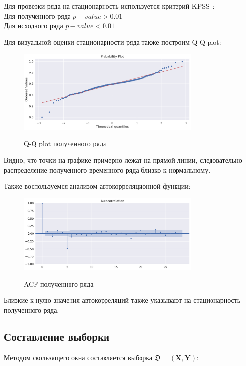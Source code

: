 Для проверки ряда на стационарность используется критерий KPSS~\cite{Критерии стационарности 1, Критерии стационарности 2}: \\
Для полученного ряда $p-value > 0.01$ \\
Для исходного ряда $p-value < 0.01$ 

Для визуальной оценки стационарности ряда также построим Q-Q plot:

\begin{figure}[h!t]\center
{\includegraphics[width=0.8\textwidth]{results/qqplot.png}}
\caption{Q-Q plot полученного ряда}
\end{figure}

Видно, что точки на графике примерно лежат на прямой линии, следовательно распределение полученного временного ряда близко к нормальному.

Также воспользуемся анализом автокорреляционной функции:

\begin{figure}[h!t]\center
{\includegraphics[width=0.8\textwidth]{results/acf.png}}
\caption{ACF полученного ряда}
\end{figure}

Близкие к нулю значения автокорреляций также указывают на стационарность полученного ряда.

\subsection{Составление выборки}

Методом скользящего окна составляется выборка $\mathfrak{D}=(\mathbf{X},\mathbf{Y})$:

